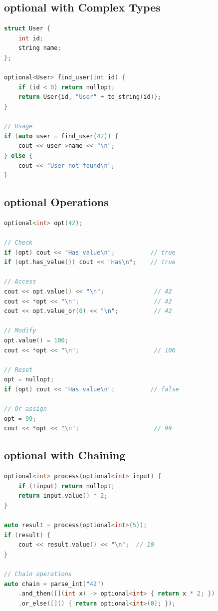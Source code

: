 \hypertarget{optional-with-complex-types}{%
\subsection{optional with Complex
Types}\label{optional-with-complex-types}}

\begin{lstlisting}[language={C++}]
struct User {
    int id;
    string name;
};

optional<User> find_user(int id) {
    if (id < 0) return nullopt;
    return User{id, "User" + to_string(id)};
}

// Usage
if (auto user = find_user(42)) {
    cout << user->name << "\n";
} else {
    cout << "User not found\n";
}
\end{lstlisting}

\hypertarget{optional-operations}{%
\subsection{optional Operations}\label{optional-operations}}

\begin{lstlisting}[language={C++}]
optional<int> opt(42);

// Check
if (opt) cout << "Has value\n";          // true
if (opt.has_value()) cout << "Has\n";    // true

// Access
cout << opt.value() << "\n";              // 42
cout << *opt << "\n";                     // 42
cout << opt.value_or(0) << "\n";          // 42

// Modify
opt.value() = 100;
cout << *opt << "\n";                     // 100

// Reset
opt = nullopt;
if (opt) cout << "Has value\n";          // false

// Or assign
opt = 99;
cout << *opt << "\n";                     // 99
\end{lstlisting}

\hypertarget{optional-with-chaining}{%
\subsection{optional with Chaining}\label{optional-with-chaining}}

\begin{lstlisting}[language={C++}]
optional<int> process(optional<int> input) {
    if (!input) return nullopt;
    return input.value() * 2;
}

auto result = process(optional<int>(5));
if (result) {
    cout << result.value() << "\n";  // 10
}

// Chain operations
auto chain = parse_int("42")
    .and_then([](int x) -> optional<int> { return x * 2; })
    .or_else([]() { return optional<int>(0); });
\end{lstlisting}

